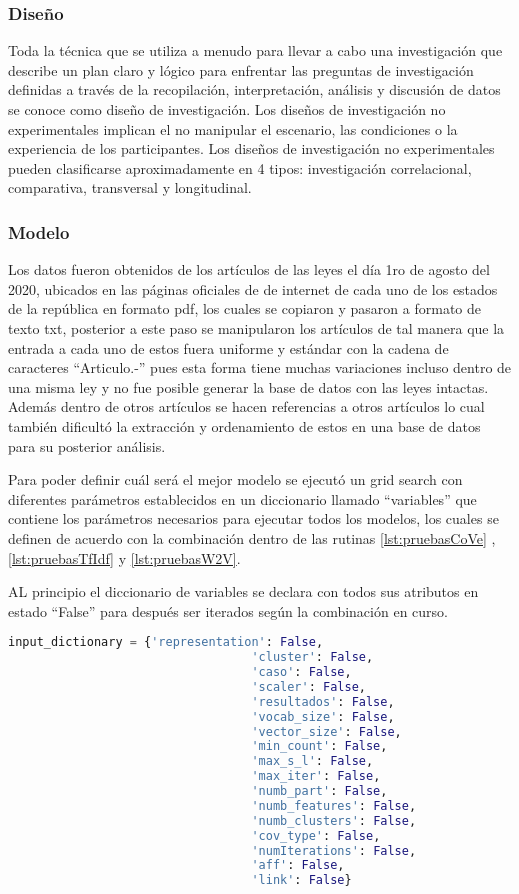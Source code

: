 \documentclass[12pt]{article}
\begin{document}
			\subsubsection{Diseño}
			Toda la técnica que se utiliza a menudo para llevar a cabo una investigación que describe un plan claro y lógico para enfrentar las preguntas de investigación definidas a través de la recopilación, interpretación, análisis y discusión de datos se conoce como diseño de investigación. Los diseños de investigación no experimentales implican el no manipular el escenario, las condiciones o la experiencia de los participantes. Los diseños de investigación no experimentales pueden clasificarse aproximadamente en 4 tipos: investigación correlacional, comparativa, transversal y longitudinal. \cite{Kumatongo2021}
			
			\subsubsection{Modelo}
			Los datos fueron obtenidos de los artículos de las leyes el día 1ro de agosto del 2020, ubicados en las páginas oficiales de de internet de cada uno de los estados de la república en formato pdf, los cuales se copiaron y pasaron a formato de texto txt, posterior a este paso se manipularon los artículos de tal manera que la entrada a cada uno de estos fuera uniforme y estándar con la cadena de caracteres ``Articulo.-'' pues esta forma tiene muchas variaciones incluso dentro de una misma ley y no fue posible generar la base de datos con las leyes intactas. Además dentro de otros artículos se hacen referencias a otros artículos lo cual también dificultó la extracción y ordenamiento de estos en una base de datos para su posterior análisis.
			
			Para poder definir cuál será el mejor modelo se ejecutó un grid search con diferentes parámetros establecidos en un diccionario llamado ``variables'' que contiene los parámetros necesarios para ejecutar todos los modelos, los cuales se definen de acuerdo con la combinación dentro de las rutinas \ref{lst:pruebasCoVe} , \ref{lst:pruebasTfIdf} y \ref{lst:pruebasW2V}.
			
			AL principio el diccionario de variables se declara con todos sus atributos en estado ``False'' para después ser iterados según la combinación en curso.             
		 	\begin{lstlisting}[language=Python, caption = Dicionario de variables]
			input_dictionary = {'representation': False,
					              'cluster': False,
					              'caso': False,
					              'scaler': False,
					              'resultados': False,
					              'vocab_size': False,
					              'vector_size': False,
					              'min_count': False,
					              'max_s_l': False,
					              'max_iter': False,
					              'numb_part': False,
					              'numb_features': False,
					              'numb_clusters': False,
					              'cov_type': False,
					              'numIterations': False,
					              'aff': False,
					              'link': False}
		 	\end{lstlisting}
\end{document}
